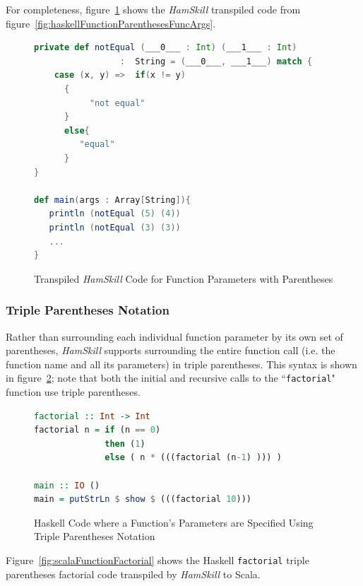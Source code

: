 \documentclass{report}
\begin{document}
For completeness, figure~\ref{fig:scalaFunctionParenthesesFuncArgs} shows the \textit{HamSkill} transpiled code from figure~\ref{fig:haskellFunctionParenthesesFuncArgs}.

\begin{figure}[H]
\begin{mdframed}
\begin{lstlisting}[language=Scala, showstringspaces=false]
private def notEqual (___0___ : Int) (___1___ : Int) 
                 :  String = (___0___, ___1___) match {
    case (x, y) =>  if(x != y)
      {
           "not equal"
      }
      else{
         "equal"
      }
} 
  
def main(args : Array[String]){
   println (notEqual (5) (4))
   println (notEqual (3) (3))
   ...
}
\end{lstlisting}
\end{mdframed}
\caption{Transpiled \textit{HamSkill} Code for Function Parameters with Parentheses}\label{fig:scalaFunctionParenthesesFuncArgs}
\end{figure}

\subsubsection{Triple Parentheses Notation}

Rather than surrounding each individual function parameter by its own set of parentheses, \textit{HamSkill} supports surrounding the entire function call (i.e. the function name and all its parameters) in triple parentheses.  This syntax is shown in figure~\ref{fig:haskellFunctionFactorial}; note that both the initial and recursive calls to the ``\texttt{factorial}" function use triple parentheses.

\begin{figure}[H]
\begin{mdframed}
\begin{lstlisting}[language=Haskell]
factorial :: Int -> Int
factorial n = if (n == 0)
              then (1)
              else ( n * (((factorial (n-1) ))) )

main :: IO ()
main = putStrLn $ show $ (((factorial 10)))
\end{lstlisting}
\end{mdframed}
\caption{Haskell Code where a Function's Parameters are Specified Using Triple Parentheses Notation}\label{fig:haskellFunctionFactorial}
\end{figure}

Figure~\ref{fig:scalaFunctionFactorial} shows the Haskell \texttt{factorial} triple parentheses factorial code transpiled by \textit{HamSkill} to Scala.
\end{document}
